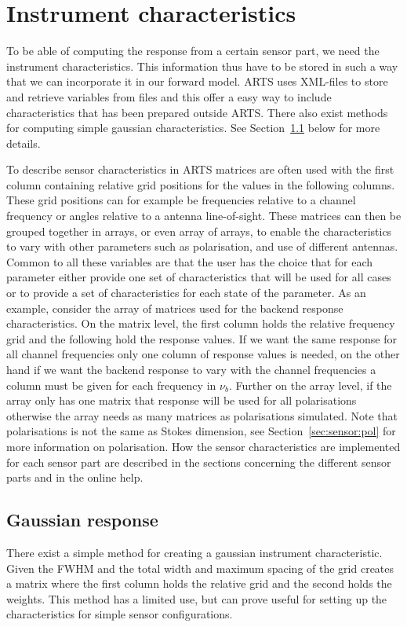 \section{Instrument characteristics}
\label{sec:sensor:instchar}
To be able of computing the response from a certain sensor part, we
need the instrument characteristics. This information thus have to be
stored in such a way that we can incorporate it in our forward
model. ARTS uses XML-files to store and retrieve variables from files
and this offer a easy way to include characteristics that has been
prepared outside ARTS.  There also exist methods for computing simple
gaussian characteristics. See Section~\ref{sec:sensor:instchar:gauss}
below for more details.

To describe sensor characteristics in ARTS matrices are often used
with the first column containing relative grid positions for the
values in the following columns. These grid positions can for example
be frequencies relative to a channel frequency or angles relative to a
antenna line-of-sight. These matrices can then be grouped together in
arrays, or even array of arrays, to enable the characteristics to vary
with other parameters such as polarisation, and use of different
antennas. Common to all these variables are that the user has the
choice that for each parameter either provide one set of
characteristics that will be used for all cases or to provide a set of
characteristics for each state of the parameter. As an example,
consider the array of matrices used for the backend response
characteristics. On the matrix level, the first column holds the
relative frequency grid and the following hold the response values. If
we want the same response for all channel frequencies only one column
of response values is needed, on the other hand if we want the backend
response to vary with the channel frequencies a column must be given
for each frequency in $\nu_b$. Further on the array level, if the
array only has one matrix that response will be used for all
polarisations otherwise the array needs as many matrices as
polarisations simulated. Note that polarisations is not the same as
Stokes dimension, see Section~\ref{sec:sensor:pol} for more
information on polarisation.  How the sensor characteristics are
implemented for each sensor part are described in the sections
concerning the different sensor parts and in the online help.

\subsection{Gaussian response}
\label{sec:sensor:instchar:gauss}
There exist a simple method for creating a gaussian instrument
characteristic. Given the FWHM and the total width and maximum spacing
of the grid  creates a matrix where the
first column holds the relative grid and the second holds the
weights. This method has a limited use, but can prove useful for
setting up the characteristics for simple sensor configurations.


